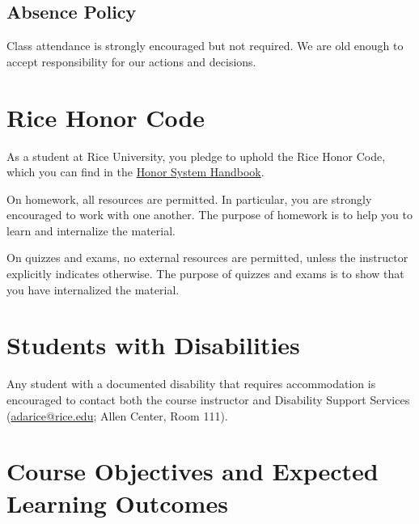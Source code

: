\subsection{Absence Policy}

Class attendance is strongly encouraged but not required. We are old enough to accept responsibility for our actions and decisions.





\section{Rice Honor Code}

As a student at Rice University, you pledge to uphold the Rice Honor Code, which you can find in the \href{http://honor.rice.edu/honor-system-handbook/}{Honor System Handbook}.

On homework, all resources are permitted. In particular, you are strongly encouraged to work with one another. The purpose of homework is to help you to learn and internalize the material.

On quizzes and exams, no external resources are permitted, unless the instructor explicitly indicates otherwise. The purpose of quizzes and exams is to show that you have internalized the material.





\section{Students with Disabilities}

Any student with a documented disability that requires accommodation is encouraged to contact both the course instructor and Disability Support Services (\href{mailto:adarice@rice.edu}{adarice@rice.edu}; Allen Center, Room 111).





%
%
%
%

\section{Course Objectives and Expected Learning Outcomes}

